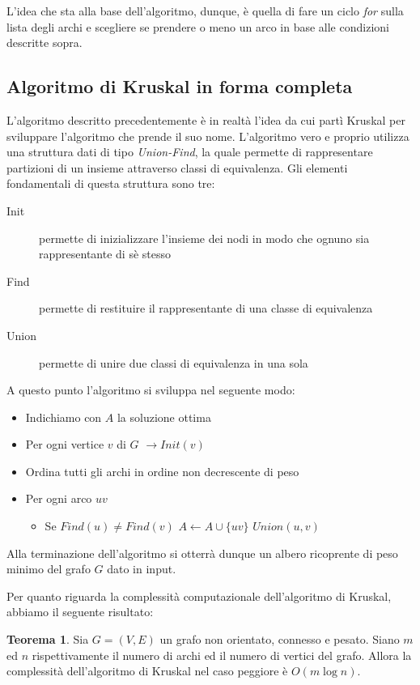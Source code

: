 \documentclass[12pt,a4paper,twoside]{article}
\theoremstyle{definition}
\theoremstyle{definition}
\theoremstyle{theorem}
\newtheorem{theorem}{Teorema}[section]
\begin{document}
	L'idea che sta alla base dell'algoritmo, dunque, è quella di fare un ciclo \emph{for} sulla lista degli archi e scegliere se prendere o meno un arco in base alle condizioni descritte sopra.
	\subsection{Algoritmo di Kruskal in forma completa}
	L'algoritmo descritto precedentemente è in realtà l'idea da cui partì Kruskal per sviluppare l'algoritmo che prende il suo nome. L'algoritmo vero e proprio utilizza una struttura dati di tipo \emph{Union-Find}, la quale permette di rappresentare partizioni di un insieme attraverso classi di equivalenza.
	Gli elementi fondamentali di questa struttura sono tre:
	\begin{description}
		\item[Init] permette di inizializzare l'insieme dei nodi in modo che ognuno sia rappresentante di sè stesso
		\item[Find] permette di restituire il rappresentante di una classe di equivalenza
		\item[Union] permette di unire due classi di equivalenza in una sola
	\end{description}
	A questo punto l'algoritmo si sviluppa nel seguente modo:
	\begin{itemize}
		\item Indichiamo con $A$ la soluzione ottima
		\item Per ogni vertice $v$ di $G$ $\longrightarrow Init(v)$ 
		\item Ordina tutti gli archi in ordine non decrescente di peso
		\item Per ogni arco $uv$
		\begin{itemize}
			\item Se $Find(u) \neq Find(v)$
				\subitem $A \leftarrow A \cup \{uv\}$
				\subitem $Union(u,v)$
		\end{itemize}
	\end{itemize}
	Alla terminazione dell'algoritmo si otterrà dunque un albero ricoprente di peso minimo del grafo $G$ dato in input.
	
	Per quanto riguarda la complessità computazionale dell'algoritmo di Kruskal, abbiamo il seguente risultato:
	\begin{theorem}
		Sia $G=(V,E)$ un grafo non orientato, connesso e pesato. Siano $m$ ed $n$ rispettivamente il numero di archi ed il numero di vertici del grafo. Allora la complessità dell'algoritmo di Kruskal nel caso peggiore è $O(m\log{n})$.
	\end{theorem}
\end{document}
